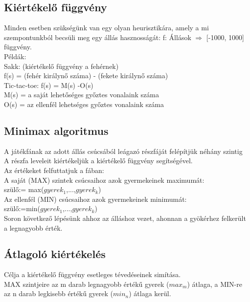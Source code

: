 \documentclass{article}
\begin{document}
	 \subsection{Kiértékelő függvény}
	 Minden esetben szükségünk van egy olyan heurisztikára, amely a mi szempontunkból becsüli meg egy állás hasznosságát: f: Állások $\Rightarrow$ [-1000, 1000] függvény.\\
	 Példák: \\
	 Sakk: (kiértékelő függvény a fehérnek)\\
	 f(s) = (fehér királynő száma) - (fekete királynő száma)\\
	 Tic-tac-toe: f(s) = M(s) -O(s)\\
	 M(s) = a saját lehetőséges győztes vonalaink száma\\
	 O(s) = az ellenfél lehetséges győztes vonalaink száma\\
	 
	 \subsection{Minimax algoritmus}
	 A játékfának az adott állás csúcsából leágazó részfáját felépítjük néhány szintig\\
	 A részfa leveleit kiértékeljük a kiértékelő függvény segítségével.\\
	 Az értékeket felfuttatjuk a fában:\\
	 \hspace*{1em} A saját (MAX) szintek csúcsaihoz azok gyermekeinek maximumát:\\
	 \hspace*{1em} szülő:= max($gyerek_1$,...,$gyerek_k$)\\
	 \hspace*{1em} Az ellenfél (MIN) csúcsaihoz azok gyermekeinek minimumát:\\ 
	 \hspace*{1em} szülő:=min($gyerek_1$,...,$gyerek_k$)\\
	 Soron következő lépésünk ahhoz az álláshoz vezet, ahonnan a gyökérhez felkerült a legnagyobb érték.
	 
	 \subsection{Átlagoló kiértékelés}
	 Célja a kiértékelő függvény esetleges tévedéseinek simítása.\\
	 MAX szintjeire az m darab legnagyobb értékű gyerek ($max_m$) átlaga, a MIN-re az n darab legkisebb értékű gyerek ($min_n$) átlaga kerül.
	 
\end{document}
